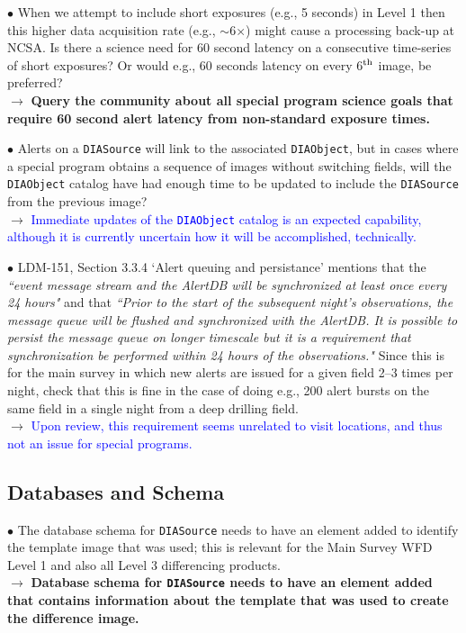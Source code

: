\documentclass[DM,lsstdraft,toc]{lsstdoc}
\begin{document}
$\bullet$ When we attempt to include short exposures (e.g., 5 seconds) in Level 1 then this higher data acquisition rate (e.g., $\sim$6$\times$) might cause a processing back-up at NCSA. Is there a science need for 60 second latency on a consecutive time-series of short exposures? Or would e.g., 60 seconds latency on every 6$^{\rm th}$ image, be preferred? \\
$\rightarrow$ \textbf{Query the community about all special program science goals that require 60 second alert latency from non-standard exposure times.}

$\bullet$ Alerts on a {\tt DIASource} will link to the associated {\tt DIAObject}, but in cases where a special program obtains a sequence of images without switching fields, will the {\tt DIAObject} catalog have had enough time to be updated to include the {\tt DIASource} from the previous image? \\
$\rightarrow$  \textcolor{blue}{Immediate updates of the {\tt DIAObject} catalog is an expected capability, although it is currently uncertain how it will be accomplished, technically.} 

$\bullet$ LDM-151, Section 3.3.4 `Alert queuing and persistance' mentions that the {\it ``event message stream and the AlertDB will be synchronized at least once every 24 hours"} and that {\it ``Prior to the start of the subsequent night's observations, the message queue will be flushed and synchronized with the AlertDB. It is possible to persist the message queue on longer timescale but it is a requirement that synchronization be performed within 24 hours of the observations."} Since this is for the main survey in which new alerts are issued for a given field 2--3 times per night, check that this is fine in the case of doing e.g., 200 alert bursts on the same field in a single night from a deep drilling field. \\
$\rightarrow$  \textcolor{blue}{Upon review, this requirement seems unrelated to visit locations, and thus not an issue for special programs.} \\


\subsection{Databases and Schema}\label{ssec:issues_databases}

$\bullet$ The database schema for {\tt DIASource} needs to have an element added to identify the template image that was used; this is relevant for the Main Survey WFD Level 1 and also all Level 3 differencing products. \\
$\rightarrow$  \textbf{Database schema for {\tt DIASource} needs to have an element added that contains information about the template that was used to create the difference image.}\\
\end{document}
